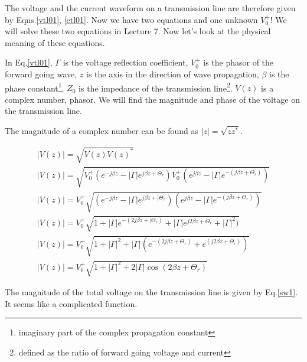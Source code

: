 \documentclass{ximera}
\begin{document}
The voltage and the current waveform on a transmission line are
therefore given by Eqns.\ref{vtl01}, \ref{ctl01}. Now we have two
equations and one unknown $V_0^+$! We will solve these two equations
in Lecture 7. Now let's look at the physical meaning of these
equations.


In Eq.\ref{vtl01}, $\Gamma$ is the voltage reflection coefficient,
$V_0^+$ is the phasor of the forward going wave, $z$ is the axis in
the direction of wave propagation, $\beta$ is the phase
constant\footnote{imaginary part of the complex propagation constant},
$Z_0$ is the impedance of the transmission line\footnote{defined as
the ratio of forward going voltage and current}. $V(z)$ is a complex
number, phasor. We will find the magnitude and phase of the voltage on
the transmission line.




The magnitude of a complex number can be found as $|z|=\sqrt{z
z^*}$.

\begin{eqnarray}
|V(z)|=\sqrt{V(z) V(z)^*} \nonumber  \\
|V(z)|=\sqrt{   V_0^+ (e^{-j \beta z} - |\Gamma|  e^{j \beta z +
 \Theta_r}  )  
   V_0^+ (e^{j \beta z} - |\Gamma|  e^{-(j \beta z + \Theta_r)}     )} \nonumber
\\
|V(z)|= V_0^+ \sqrt{(e^{-j \beta z} - |\Gamma|  e^{j \beta z +
|\Theta_r}  )  
  (e^{j \beta z} - |\Gamma|  e^{-(j \beta z + \Theta_r)}     )}
\nonumber \\
|V(z)|= V_0^+ \sqrt{1+  |\Gamma|  e^{-(2j \beta z +
|\Theta_r)}    + |\Gamma|  e^{j 2 \beta z + \Theta_r} +|\Gamma|^2     )}
\nonumber \\
|V(z)|= V_0^+ \sqrt{1+ |\Gamma|^2 + |\Gamma| ( e^{-(2j \beta z +
 \Theta_r)}   +  e^{(j 2 \beta z + \Theta_r)}     )}
 \nonumber \\
|V(z)|= V_0^+  \sqrt{1+ |\Gamma|^2 + 2 |\Gamma| \cos(2 \beta z +\Theta_r)} \label{sw1} 
\end{eqnarray}

The magnitude of the total voltage on the transmission line is given
by Eq.\ref{sw1}. It seems like a complicated function.
\end{document}
